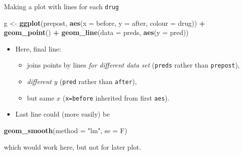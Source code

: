 \documentclass[ignorenonframetext,]{beamer}
\newenvironment{Shaded}{\begin{snugshade}}{\end{snugshade}}
\newcommand{\DataTypeTok}[1]{\textcolor[rgb]{0.13,0.29,0.53}{#1}}
\newcommand{\KeywordTok}[1]{\textcolor[rgb]{0.13,0.29,0.53}{\textbf{#1}}}
\newcommand{\NormalTok}[1]{#1}
\newcommand{\OperatorTok}[1]{\textcolor[rgb]{0.81,0.36,0.00}{\textbf{#1}}}
\newcommand{\StringTok}[1]{\textcolor[rgb]{0.31,0.60,0.02}{#1}}
\begin{document}
\begin{frame}[fragile]{Making a plot with lines for each \texttt{drug}}
\protect\hypertarget{making-a-plot-with-lines-for-each-drug}{}

\begin{Shaded}
\begin{Highlighting}[]
\NormalTok{g <-}\StringTok{ }\KeywordTok{ggplot}\NormalTok{(prepost,}
  \KeywordTok{aes}\NormalTok{(}\DataTypeTok{x =}\NormalTok{ before, }\DataTypeTok{y =}\NormalTok{ after, }\DataTypeTok{colour =}\NormalTok{ drug)) }\OperatorTok{+}
\StringTok{  }\KeywordTok{geom_point}\NormalTok{() }\OperatorTok{+}\StringTok{ }\KeywordTok{geom_line}\NormalTok{(}\DataTypeTok{data =}\NormalTok{ preds, }\KeywordTok{aes}\NormalTok{(}\DataTypeTok{y =}\NormalTok{ pred))}
\end{Highlighting}
\end{Shaded}

\begin{itemize}
\item
  Here, final line:

  \begin{itemize}
  \item
    joins points by lines \emph{for different data
    set} (\texttt{preds} rather than \texttt{prepost}),
  \item
    \emph{different \(y\)} (\texttt{pred} rather than \texttt{after}),
  \item
    but same \(x\) (\texttt{x=before} inherited from first
    \texttt{aes}).
  \end{itemize}
\item
  Last line could (more easily) be
\end{itemize}

\begin{Shaded}
\begin{Highlighting}[]
\KeywordTok{geom_smooth}\NormalTok{(}\DataTypeTok{method =} \StringTok{"lm"}\NormalTok{, }\DataTypeTok{se =}\NormalTok{ F)}
\end{Highlighting}
\end{Shaded}

which would work here, but not for later plot.

\end{frame}
\end{document}
